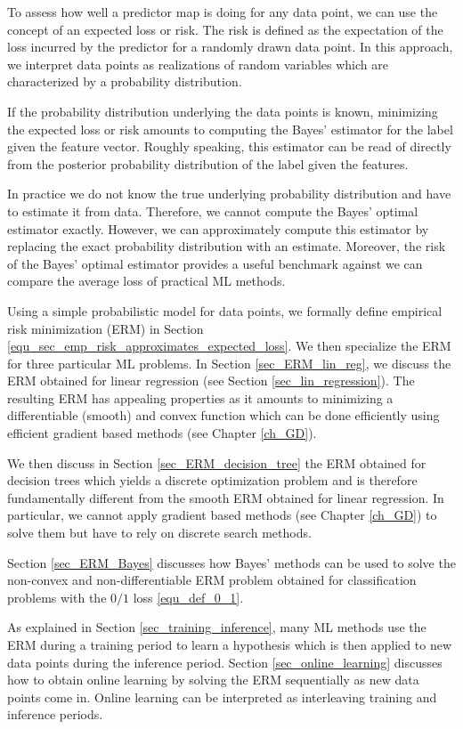 \documentclass[12pt]{report}
\begin{document}
To assess how well a predictor map is doing for any data point, 
we can use the concept of an expected loss or risk. The risk is 
defined as the expectation of the loss incurred by the predictor 
for a randomly drawn data point. In this approach, we interpret 
data points as realizations of random variables which are 
characterized by a probability distribution. 

If the probability distribution underlying the data points is known, 
minimizing the expected loss or risk amounts to computing the 
Bayes' estimator for the label given the feature vector. 
Roughly speaking, this estimator can be read of directly from the 
posterior probability distribution of the label given the features. 

In practice we do not know the true underlying probability 
distribution and have to estimate it from data. Therefore, 
we cannot compute the Bayes' optimal estimator exactly. 
However, we can approximately compute this estimator 
by replacing the exact probability distribution with an 
estimate. Moreover, the risk of the Bayes' optimal estimator 
provides a useful benchmark against we can compare the 
average loss of practical ML methods. 

Using a simple probabilistic model for data points, we formally define 
empirical risk minimization (ERM) in Section \eqref{equ_sec_emp_risk_approximates_expected_loss}. 
We then specialize the ERM for three particular ML problems. In Section \ref{sec_ERM_lin_reg}, 
we discuss the ERM obtained for linear regression (see Section \ref{sec_lin_regression}). 
The resulting ERM has appealing properties as it amounts to 
minimizing a differentiable (smooth) and convex function which 
can be done efficiently using efficient gradient based methods (see Chapter \ref{ch_GD}). 

We then discuss in Section \ref{sec_ERM_decision_tree} the ERM 
obtained for decision trees which yields a discrete optimization 
problem and is therefore fundamentally different from the smooth 
ERM obtained for linear regression. In particular, we cannot apply 
gradient based methods (see Chapter \ref{ch_GD}) to solve them 
but have to rely on discrete search methods. 

Section \ref{sec_ERM_Bayes} discusses how Bayes' methods 
can be used to solve the non-convex and non-differentiable 
ERM problem obtained for classification problems with the 
$0/1$ loss \eqref{equ_def_0_1}. 

As explained in Section \ref{sec_training_inference}, many ML methods 
use the ERM during a training period to learn a hypothesis which is 
then applied to new data points during the inference period. 
Section \ref{sec_online_learning} discusses how to obtain online 
learning by solving the ERM sequentially as new data points come in. 
Online learning can be interpreted as interleaving training and inference 
periods. 
\end{document}
